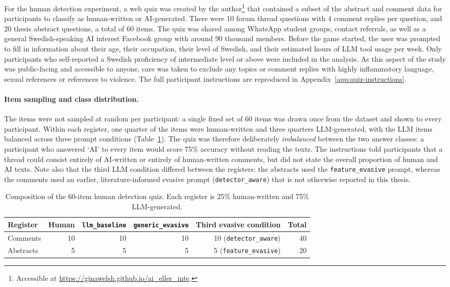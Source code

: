 \documentclass[thesis]{cluu}
\begin{document}
For the human detection experiment, a web quiz was created by the author\footnote{Accessible at \url{https://ginawelsh.github.io/ai_eller_inte}.} that contained a subset of the abstract and comment data for participants to classify as human-written or AI-generated. There were 10 forum thread questions with 4 comment replies per question, and 20 thesis abstract questions, a total of 60 items. The quiz was shared among WhatsApp student groups, contact referrals, as well as a general Swedish-speaking AI interest Facebook group with around 90 thousand members. Before the game started, the user was prompted to fill in information about their age, their occupation, their level of Swedish, and their estimated hours of LLM tool usage per week. Only participants who self-reported a Swedish proficiency of intermediate level or above were included in the analysis. As this aspect of the study was public-facing and accessible to anyone, care was taken to exclude any topics or comment replies with highly inflammatory language, sexual references or references to violence. The full participant instructions are reproduced in Appendix~\ref{app:quiz-instructions}.

\paragraph{Item sampling and class distribution.} The items were not sampled at random per participant: a single fixed set of 60 items was drawn once from the dataset and shown to every participant. Within each register, one quarter of the items were human-written and three quarters LLM-generated, with the LLM items balanced across three prompt conditions (Table~\ref{tab:quiz-composition}). The quiz was therefore deliberately \emph{imbalanced} between the two answer classes: a participant who answered `AI' to every item would score 75\% accuracy without reading the texts. The instructions told participants that a thread could consist entirely of AI-written or entirely of human-written comments, but did not state the overall proportion of human and AI texts. Note also that the third LLM condition differed between the registers: the abstracts used the \texttt{feature\_evasive} prompt, whereas the comments used an earlier, literature-informed evasive prompt (\texttt{detector\_aware}) that is not otherwise reported in this thesis.

\begin{table}[H]
\centering
\small
\begin{tabular}{lrrrrr}
\toprule
Register & Human & \texttt{llm\_baseline} & \texttt{generic\_evasive} & Third evasive condition & Total \\
\midrule
Comments  & 10 & 10 & 10 & 10 (\texttt{detector\_aware})  & 40 \\
Abstracts & 5  & 5  & 5  & 5 (\texttt{feature\_evasive}) & 20 \\
\bottomrule
\end{tabular}
\caption{Composition of the 60-item human detection quiz. Each register is 25\% human-written and 75\% LLM-generated.}
\label{tab:quiz-composition}
\end{table}
\end{document}
